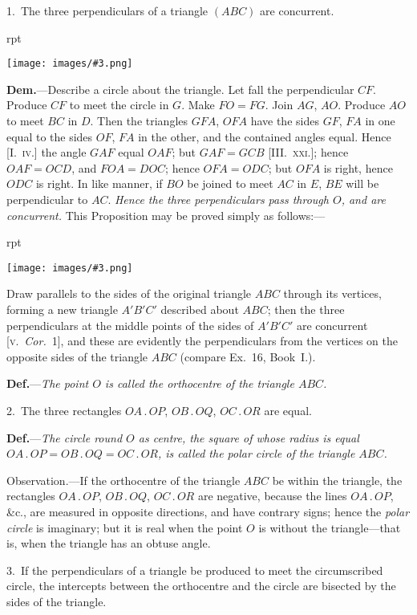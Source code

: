 \documentclass[oneside]{book}
\newcounter{wrapwidth}
\newcommand\imgflow[3]{
\setcounter{wrapwidth}{#1}
\begin{wrapfigure}[#2]{r}{\value{wrapwidth}pt}
\begin{center}
\vspace{-0.3in}
\texttt{[image: images/\#3.png]}
\end{center}
\end{wrapfigure}
}
\begin{document}
\begin{footnotesize}
1.~The three perpendiculars of a triangle $(ABC)$ are concurrent.

\imgflow{103}{10}{f157}

\textbf{Dem.}---Describe a circle about the triangle. Let fall the perpendicular
$CF$. Produce $CF$ to meet the
circle in $G$. Make $FO = FG$. Join $AG$,
$AO$. Produce $AO$ to meet $BC$ in $D$.
Then the triangles $GFA$, $OFA$ have the
sides $GF$, $FA$ in one equal to the sides
$OF$, $FA$ in the other, and the contained
angles equal. Hence [I.~\textsc{iv}.] the angle
$GAF$ equal $OAF$; but $GAF = GCB$
[III\@.~\textsc{xxi}.]; hence $OAF = OCD$, and $FOA
= DOC$; hence $OFA = ODC$; but $OFA$
is right, hence $ODC$ is right. In like
manner, if $BO$ be joined to meet $AC$ in $E$, $BE$ will be perpendicular
to $AC$. \emph{Hence the three perpendiculars pass through $O$,
and are concurrent.} This Proposition may be proved simply as
follows:---

\imgflow{150}{13}{f158}

Draw parallels to the sides of the original triangle $ABC$ through
its vertices, forming a new triangle
$A'B'C'$ described about
$ABC$; then the three perpendiculars
at the middle points of the
sides of $A'B'C'$ are concurrent [\textsc{v.}~\emph{Cor.}~1],
and these are evidently
the perpendiculars from the vertices
on the opposite sides of the
triangle $ABC$ (compare Ex.~16,
Book~I.).

\textbf{Def.}---\textit{The point $O$ is called the
orthocentre of the triangle $ABC$.}

2.~The three rectangles $OA\,.\,OP$, $OB\,.\,OQ$, $OC\,.\,OR$ are equal.

\textbf{Def.}---\textit{The circle round $O$ as centre, the square of whose radius
is equal $OA\,.\,OP = OB\,.\,OQ = OC\,.\,OR$, is called the polar circle
of the triangle $ABC$.}

\textsf{Observation.}---If the orthocentre of the triangle $ABC$ be
within the triangle, the rectangles $OA\,.\,OP$, $OB\,.\,OQ$, $OC\,.\,OR$ are
negative, because the lines $OA\,.\,OP$, \&c., are measured in opposite
directions, and have contrary signs; hence the \emph{polar circle} is
imaginary; but it is real when the point $O$ is without the triangle---that
is, when the triangle has an obtuse angle.

3.~If the perpendiculars of a triangle be produced to meet the
circumscribed circle, the intercepts between the orthocentre and
the circle are bisected by the sides of the triangle.


\end{footnotesize}
\end{document}
